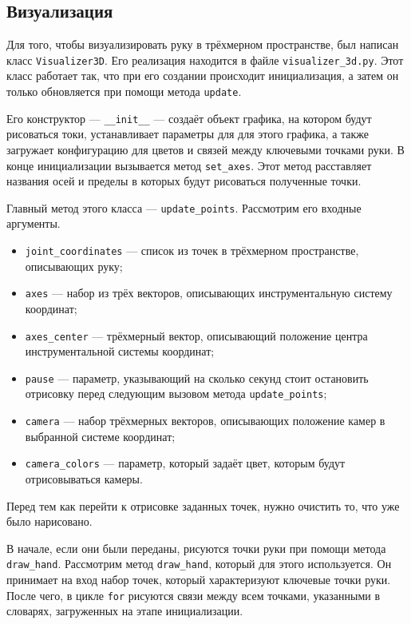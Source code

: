 \documentclass[14pt, a4paper]{extarticle}
\begin{document}
\subsection{Визуализация}
Для того, чтобы визуализировать руку в трёхмерном пространстве, был написан
класс \texttt{Visualizer3D}. Его реализация находится в файле
\texttt{visualizer\_3d.py}.
Этот класс работает так, что при его создании происходит инициализация, а
затем он только обновляется при помощи метода \texttt{update}.

Его конструктор  --- \texttt{\_\_init\_\_} ---  создаёт объект графика, на
котором будут рисоваться токи, устанавливает параметры для для этого графика, а
также загружает конфигурацию для цветов и связей между ключевыми точками руки.
 В конце инициализации вызывается метод \texttt{set\_axes}. Этот метод
  расставляет названия осей и пределы в которых будут рисоваться полученные точки.

Главный метод этого класса --- \texttt{update\_points}. Рассмотрим его входные аргументы.
\begin{itemize}
  \item \texttt{joint\_coordinates} --- список из точек в трёхмерном
    пространстве, описывающих руку;
  \item \texttt{axes} --- набор из трёх векторов, описывающих инструментальную
    систему координат;
  \item \texttt{axes\_center} --- трёхмерный вектор, описывающий положение
    центра инструментальной системы координат;
  \item \texttt{pause} --- параметр, указывающий на сколько секунд стоит
    остановить отрисовку перед следующим вызовом метода
    \texttt{update\_points};
  \item \texttt{camera} --- набор трёхмерных векторов, описывающих положение
    камер в выбранной системе координат;
  \item \texttt{camera\_colors} --- параметр, который задаёт цвет, которым
    будут отрисовываться камеры.
\end{itemize}

Перед тем как перейти к отрисовке заданных точек, нужно очистить то, что уже
было нарисовано.

В начале, если они были переданы, рисуются точки руки при помощи метода
\texttt{draw\_hand}.
Рассмотрим метод \texttt{draw\_hand}, который для этого используется.
Он принимает на вход набор точек, который характеризуют ключевые точки руки.
После чего, в цикле \texttt{for} рисуются связи между всем точками, указанными
в словарях, загруженных на этапе инициализации.
\end{document}
